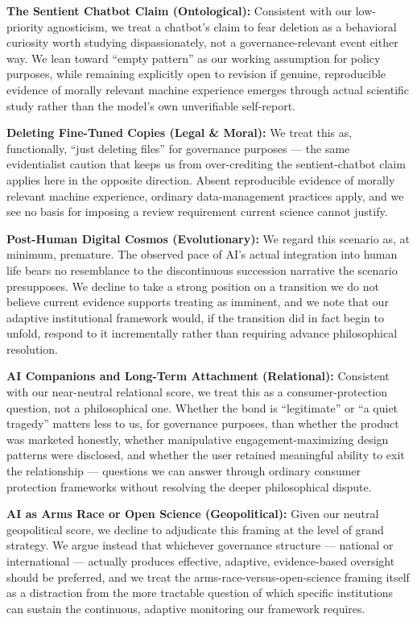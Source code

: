 \textbf{The Sentient Chatbot Claim (Ontological):} Consistent with our
low-priority agnosticism, we treat a chatbot's claim to fear deletion as
a behavioral curiosity worth studying dispassionately, not a
governance-relevant event either way. We lean toward ``empty pattern''
as our working assumption for policy purposes, while remaining
explicitly open to revision if genuine, reproducible evidence of morally
relevant machine experience emerges through actual scientific study
rather than the model's own unverifiable self-report.

\textbf{Deleting Fine-Tuned Copies (Legal \& Moral):} We treat this as,
functionally, ``just deleting files'' for governance purposes --- the
same evidentialist caution that keeps us from over-crediting the
sentient-chatbot claim applies here in the opposite direction. Absent
reproducible evidence of morally relevant machine experience, ordinary
data-management practices apply, and we see no basis for imposing a
review requirement current science cannot justify.

\textbf{Post-Human Digital Cosmos (Evolutionary):} We regard this
scenario as, at minimum, premature. The observed pace of AI's actual
integration into human life bears no resemblance to the discontinuous
succession narrative the scenario presupposes. We decline to take a
strong position on a transition we do not believe current evidence
supports treating as imminent, and we note that our adaptive
institutional framework would, if the transition did in fact begin to
unfold, respond to it incrementally rather than requiring advance
philosophical resolution.

\textbf{AI Companions and Long-Term Attachment (Relational):} Consistent
with our near-neutral relational score, we treat this as a
consumer-protection question, not a philosophical one. Whether the bond
is ``legitimate'' or ``a quiet tragedy'' matters less to us, for
governance purposes, than whether the product was marketed honestly,
whether manipulative engagement-maximizing design patterns were
disclosed, and whether the user retained meaningful ability to exit the
relationship --- questions we can answer through ordinary consumer
protection frameworks without resolving the deeper philosophical
dispute.

\textbf{AI as Arms Race or Open Science (Geopolitical):} Given our
neutral geopolitical score, we decline to adjudicate this framing at the
level of grand strategy. We argue instead that whichever governance
structure --- national or international --- actually produces effective,
adaptive, evidence-based oversight should be preferred, and we treat the
arms-race-versus-open-science framing itself as a distraction from the
more tractable question of which specific institutions can sustain the
continuous, adaptive monitoring our framework requires.

